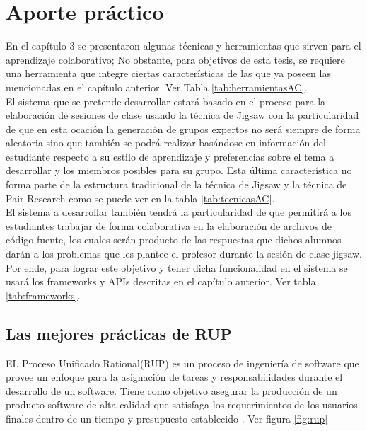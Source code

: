 \chapter{Aporte práctico}

En el capítulo 3 se presentaron algunas técnicas y herramientas que sirven para el aprendizaje colaborativo; No obstante, para objetivos de esta tesis, se requiere una herramienta que integre ciertas características de las que ya poseen las mencionadas en el capítulo anterior. Ver Tabla \ref{tab:herramientasAC}.\\
 
El sistema que se pretende desarrollar estará basado en el proceso para la elaboración de sesiones de clase usando la técnica de Jigsaw con la particularidad de que en esta ocación la generación de grupos expertos no será siempre de forma aleatoria sino que también se podrá realizar basándose en información del estudiante respecto a su estilo de aprendizaje y preferencias sobre el tema a desarrollar y los miembros posibles para su grupo. Esta última característica no forma parte de la estructura tradicional de la técnica de Jigsaw y la técnica de Pair Research como se puede ver en la tabla \ref{tab:tecnicasAC}.\\

El sistema a desarrollar también tendrá la particularidad de que permitirá a los estudiantes trabajar de forma colaborativa en la elaboración de archivos de código fuente, los cuales serán producto de las respuestas que dichos alumnos darán a los problemas que les plantee el profesor durante la sesión de clase jigsaw. Por ende, para lograr este objetivo y tener dicha funcionalidad en el sistema se usará los frameworks y APIs descritas en el capítulo anterior. Ver tabla \ref{tab:frameworks}.

\section{Las mejores prácticas de RUP}
EL Proceso Unificado Rational(RUP) es un proceso de ingeniería de software que provee un enfoque para la asignación de tareas y responsabilidades durante el desarrollo de un software. Tiene como objetivo asegurar la producción de un producto software de alta calidad que satisfaga los requerimientos de los usuarios finales dentro de un tiempo y presupuesto establecido \cite{rup_ibm_2014}. Ver figura \ref{fig:rup}\\

